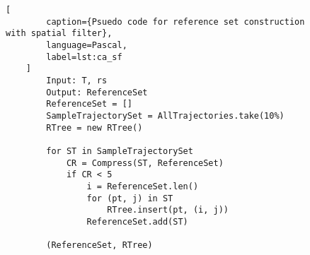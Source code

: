 \begin{figure}[t]
    \begin{lstlisting}[
        caption={Psuedo code for reference set construction with spatial filter},
        language=Pascal,
        label=lst:ca_sf
    ]
        Input: T, rs
        Output: ReferenceSet
        ReferenceSet = []
        SampleTrajectorySet = AllTrajectories.take(10%)
        RTree = new RTree()

        for ST in SampleTrajectorySet
            CR = Compress(ST, ReferenceSet)
            if CR < 5 
                i = ReferenceSet.len()
                for (pt, j) in ST
                    RTree.insert(pt, (i, j))
                ReferenceSet.add(ST)

        (ReferenceSet, RTree)
    \end{lstlisting}
\end{figure}
